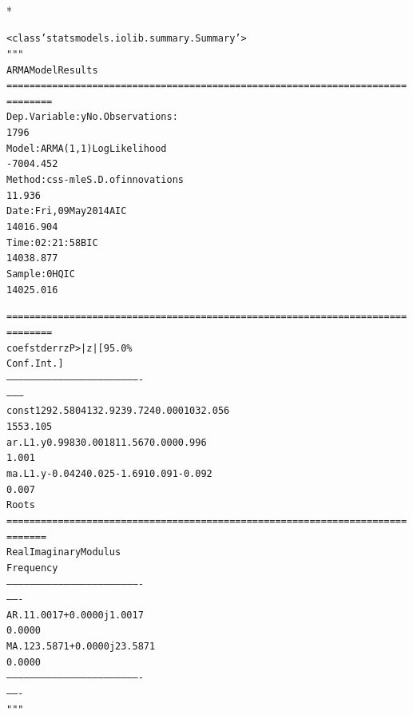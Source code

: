 \documentclass[letterpaper,10pt,english]{/Users/edwsurewin/anaconda/lib/python2.7/site-packages/sphinx/texinputs/sphinxhowto}
\def\smaller{\fontsize{9.5pt}{9.5pt}\selectfont}
\newenvironment{InvisibleVerbatim}
        {\begin{mdframed}[leftmargin=0.1\linewidth,innerleftmargin=3pt,innerrightmargin=3pt, userdefinedwidth=1\linewidth, linewidth=0pt, linecolor=white, usetwoside=false]}
        {\end{mdframed}}
\begin{document}
    

        
        

            
                \makebox[0.1\linewidth]{\smaller\hfill\tt\color{nbframe-out-prompt}Out\hspace{4pt}{[}6{]}:\hspace{4pt}}\\*
                \vspace{-2.55\baselineskip}\begin{InvisibleVerbatim}
                \vspace{-0.5\baselineskip}
\begin{alltt}<class 'statsmodels.iolib.summary.Summary'>
"""
                              ARMA Model Results
======================================================================
========
Dep. Variable:                      y   No. Observations:
1796
Model:                     ARMA(1, 1)   Log Likelihood
-7004.452
Method:                       css-mle   S.D. of innovations
11.936
Date:                Fri, 09 May 2014   AIC
14016.904
Time:                        02:21:58   BIC
14038.877
Sample:                             0   HQIC
14025.016

======================================================================
========
                 coef    std err          z      P>|z|      [95.0\%
Conf. Int.]
----------------------------------------------------------------------
--------
const       1292.5804    132.923      9.724      0.000      1032.056
1553.105
ar.L1.y        0.9983      0.001    811.567      0.000         0.996
1.001
ma.L1.y       -0.0424      0.025     -1.691      0.091        -0.092
0.007
                                    Roots
======================================================================
=======
                 Real           Imaginary           Modulus
Frequency
----------------------------------------------------------------------
-------
AR.1            1.0017           +0.0000j            1.0017
0.0000
MA.1           23.5871           +0.0000j           23.5871
0.0000
----------------------------------------------------------------------
-------
"""\end{alltt}

            \end{InvisibleVerbatim}
            
\end{document}
